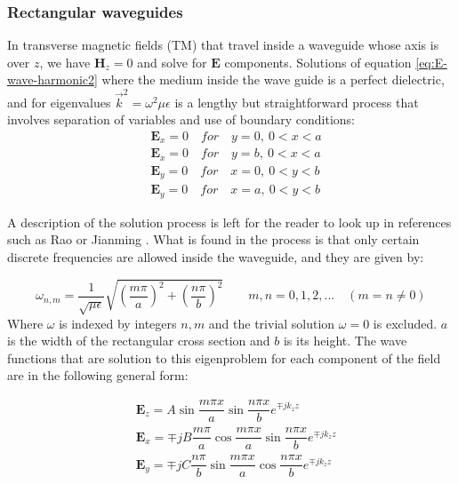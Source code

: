 \subsubsection{Rectangular waveguides} 

In transverse magnetic fields (TM) that travel inside a waveguide whose axis is over $z$, we have $\mathbf{H}_z = 0$ and solve for $\mathbf{E}$ components. 
Solutions of equation \ref{eq:E-wave-harmonic2} where the medium inside the wave guide is a perfect dielectric, and  for eigenvalues $\vec{k}^2 = \omega^2\mu\epsilon$ is a lengthy but straightforward process that involves separation of variables and use of boundary conditions:
\begin{align}
&\mathbf{E}_x = 0 \quad for \quad y=0,\ 0<x<a\\
&\mathbf{E}_x = 0 \quad for \quad y=b,\ 0<x<a\\
&\mathbf{E}_y = 0 \quad for \quad x=0,\ 0<y<b\\
&\mathbf{E}_y = 0 \quad for \quad x=a,\ 0<y<b
\end{align}

A description of the solution process is left for the reader to look up in references such as Rao  \cite{Rao2004} or Jianming \cite{Jin2010}. What is found in the process is that only certain discrete frequencies are allowed inside the waveguide, and they are given by:

\begin{equation}
\omega_{n,m} = \frac{1}{\sqrt{\mu\epsilon}}\sqrt{\left(\frac{m\pi}{a}\right)^2+\left(\frac{n\pi}{b}\right)^2}
\qquad m,n = 0,1,2,... \quad (m=n\neq0)
\label{eq:eig_vals_sqare_waveguide}
\end{equation}
Where $\omega$ is indexed by integers $n,m$ and the trivial solution $\omega = 0$ is excluded. $a$ is the width of the rectangular cross section and $b$ is its height.
The wave functions that are solution to this eigenproblem for each component of the field are in the following general form:

\begin{align}
&\mathbf{E}_z = A\sin{\dfrac{m\pi x}{a}}\sin{\dfrac{n\pi x}{b}}e^{\mp jk_zz} \label{eq:Ez_mag}\\
&\mathbf{E}_x =\mp jB\dfrac{m\pi}{a}\cos{\dfrac{m\pi x}{a}}\sin{\dfrac{n\pi x}{b}}e^{\mp jk_zz}\\
&\mathbf{E}_y =\mp jC\dfrac{n\pi}{b}\sin{\dfrac{m\pi x}{a}}\cos{\dfrac{n\pi x}{b}}e^{\mp jk_zz}
\end{align}

